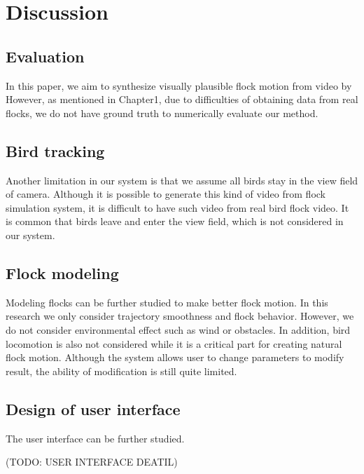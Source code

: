 \chapter{Discussion}


\section{Evaluation}


In this paper, we aim to synthesize visually plausible flock motion from video by However, as mentioned in Chapter1, due to difficulties of obtaining data from real flocks, we do not have ground truth to numerically evaluate our method.


\section{Bird tracking}


Another limitation in our system is that we assume all birds stay in the view field of camera. Although it is possible to generate this kind of video from flock simulation system, it is difficult to have such video from real bird flock video. It is common that birds leave and enter the view field, which is not considered in our system. 


\section{Flock modeling}


Modeling flocks can be further studied to make better flock motion. In this research we only consider trajectory smoothness and flock behavior. However, we do not consider environmental effect such as wind or obstacles. In addition, bird locomotion is also not considered while it is a critical part for creating natural flock motion. 
Although the system allows user to change parameters to modify result, the ability of modification is still quite limited. 


\section{Design of user interface}


The user interface can be further studied.


(TODO: USER INTERFACE DEATIL)
